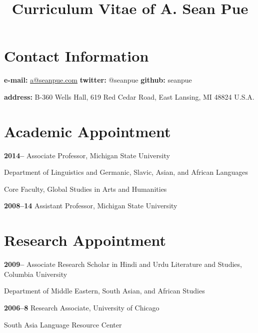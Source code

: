 \documentclass[letterpaper,12pt]{article}
\title{\phantomsection%
  Curriculum Vitae of A. Sean Pue%
  \label{curriculum-vitae-of-a-sean-pue}}
\author{}
\date{}
\newenvironment{DUlineblock}[1]{%
    \list{}{\setlength{\partopsep}{\parskip}
            \addtolength{\partopsep}{\baselineskip}
            \setlength{\topsep}{0pt}
            \setlength{\itemsep}{0.15\baselineskip}
            \setlength{\parsep}{0pt}
            \setlength{\leftmargin}{#1}}
    \raggedright
  }
  {\endlist}
\begin{document}
\maketitle


\section{Contact Information%
  \label{contact-information}%
}

\begin{DUlineblock}{0em}
\item[] \textbf{e-mail:}
\href{mailto:a@seanpue.com}{a@seanpue.com}
\textbf{twitter:}
@seanpue
\textbf{github:}
seanpue
\item[] \textbf{address:}
B-360 Wells Hall, 619 Red Cedar Road, East Lansing, MI 48824 U.S.A.
\end{DUlineblock}


\section{Academic Appointment%
  \label{academic-appointment}%
}

\begin{DUlineblock}{0em}
\item[] \textbf{2014–}
Associate Professor, Michigan State University
\item[]
\begin{DUlineblock}{\DUlineblockindent}
\item[] Department of Linguistics and Germanic, Slavic, Asian, and African Languages
\item[] Core Faculty, Global Studies in Arts and Humanities
\end{DUlineblock}
\item[] \textbf{2008–14}
Assistant Professor, Michigan State University
\end{DUlineblock}


\section{Research Appointment%
  \label{research-appointment}%
}

\begin{DUlineblock}{0em}
\item[] \textbf{2009–}
Associate Research Scholar in Hindi and Urdu Literature and Studies, Columbia University
\item[]
\begin{DUlineblock}{\DUlineblockindent}
\item[] Department of Middle Eastern, South Asian, and African Studies
\end{DUlineblock}
\item[] \textbf{2006–8}
Research Associate, University of Chicago
\item[]
\begin{DUlineblock}{\DUlineblockindent}
\item[] South Asia Language Resource Center
\end{DUlineblock}
\end{DUlineblock}
\end{document}
